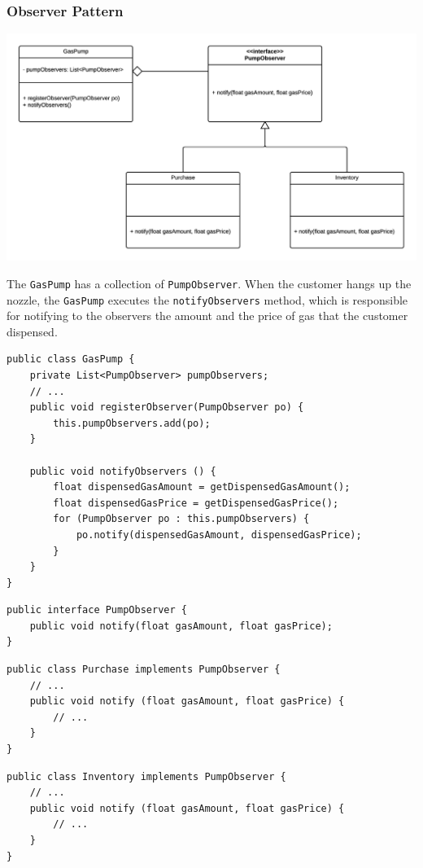 \documentclass[11pt, a4paper]{article}
\newcommand{\settextlisting}{\lstset{ basicstyle=\small\ttfamily }}
\newcommand{\setcodelisting}{\lstset{ basicstyle=\footnotesize\ttfamily }}
\begin{document}
\subsubsection{Observer Pattern}

\includegraphics[width=\textwidth]{ObserverPattern.png}

\settextlisting
The \lstinline|GasPump| has a collection of \lstinline|PumpObserver|.
When the customer hangs up the nozzle, the \lstinline|GasPump| executes the \lstinline|notifyObservers| method, which is responsible for notifying to the observers the amount and the price of gas that the customer dispensed.

\bigskip
\setcodelisting
\begin{lstlisting}
public class GasPump {
	private List<PumpObserver> pumpObservers;
	// ...
	public void registerObserver(PumpObserver po) {
		this.pumpObservers.add(po);
	}
	
	public void notifyObservers () {
		float dispensedGasAmount = getDispensedGasAmount();
		float dispensedGasPrice = getDispensedGasPrice();
		for (PumpObserver po : this.pumpObservers) {
			po.notify(dispensedGasAmount, dispensedGasPrice);
		}
	}
}
\end{lstlisting}


\begin{lstlisting}
public interface PumpObserver {
	public void notify(float gasAmount, float gasPrice);
}
\end{lstlisting}


\begin{lstlisting}
public class Purchase implements PumpObserver {
	// ...
	public void notify (float gasAmount, float gasPrice) {
		// ...
	}
}
\end{lstlisting}


\begin{lstlisting}
public class Inventory implements PumpObserver {
	// ...
	public void notify (float gasAmount, float gasPrice) {
		// ...
	}
}
\end{lstlisting}
\end{document}
